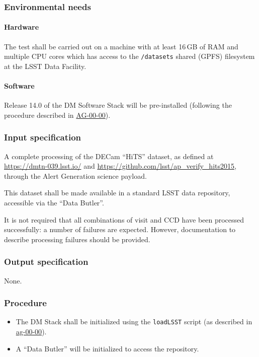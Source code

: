\subsubsection{Environmental needs}

\paragraph{Hardware}

The test shall be carried out on a machine with at least 16\,GB of RAM and
multiple CPU cores which has access to the \texttt{/datasets} shared (GPFS)
filesystem at the LSST Data Facility.

\paragraph{Software}

Release 14.0 of the DM Software Stack will be pre-installed (following the
procedure described in \hyperref[ag-00-00]{AG-00-00}).

\subsubsection{Input specification}

A complete processing of the DECam ``HiTS'' dataset, as defined at
\url{https://dmtn-039.lsst.io/} and
\url{https://github.com/lsst/ap_verify_hits2015}, through the Alert
Generation science payload.

This dataset shall be made available in a standard LSST data repository,
accessible via the ``Data Butler''.

It is not required that all combinations of visit and CCD have been processed
successfully: a number of failures are expected. However, documentation to
describe processing failures should be provided.

\subsubsection{Output specification}

None.

\subsubsection{Procedure}

\begin{itemize}

  \item{The DM Stack shall be initialized using the \texttt{loadLSST} script
  (as described in \hyperref[ag-00-00]{ag-00-00}).}

  \item{A ``Data Butler'' will be initialized to access the repository.}

\end{itemize}
